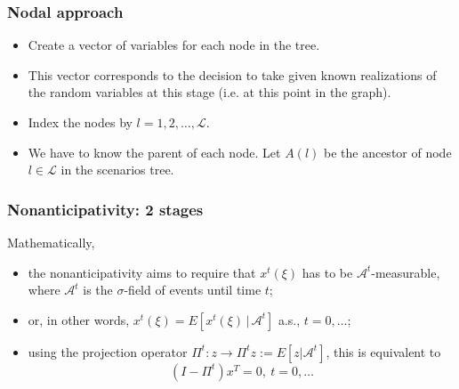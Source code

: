\documentclass[french]{beamer}
\begin{document}
\begin{frame}
\frametitle{Nodal approach}

\begin{itemize}
\item
Create a vector of variables for each node in the tree.
\item
This vector corresponds to the decision to take given known realizations of the random variables at this stage (i.e. at this point in the graph).
\item
Index the nodes by $l = 1,2,\ldots,\mathcal{L}$.
\item
We have to know the parent of each node.
Let $A(l)$ be the ancestor of node $l \in \mathcal{L}$ in the scenarios tree.
\end{itemize}

\end{frame}


\begin{frame}
\frametitle{Nonanticipativity: 2 stages}

\begin{minipage}{0.45\textwidth}
\begin{center}
\hspace*{1cm} 
\end{center}
\end{minipage}
\hfill
\begin{minipage}{0.45\textwidth}
\begin{center}
\end{center}
\end{minipage}

Mathematically,
\begin{itemize}
\item
the nonanticipativity aims to require that $x^t(\xi)$ has to be $\mathcal{A}^t$-measurable, where $\mathcal{A}^t$ is the $\sigma$-field of events until time $t$;
\item
or, in other words, $x^t(\xi) = E[x^t(\xi) \,|\, \mathcal{A}^t]$ a.s., $t = 0,\ldots$;
\item
using the projection operator $\Pi^t: z \rightarrow \Pi^t z := E[ z | \mathcal{A}^t]$, this is equivalent to
\[
(I-\Pi^t)x^T = 0,\ t = 0,\ldots
\]
\end{itemize}

\end{frame}
\end{document}
